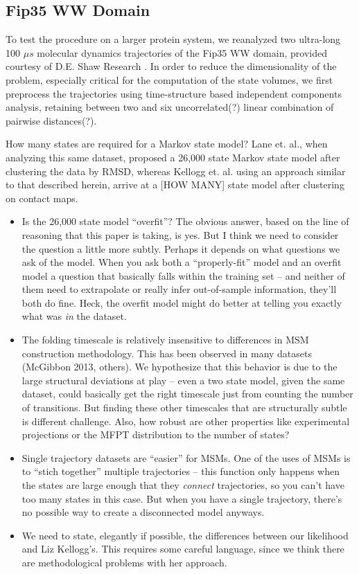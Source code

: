\documentclass[twocolumn,floatfix,nofootinbib,aps]{revtex4-1}
\begin{document}
\subsection{Fip35 WW Domain}

To test the procedure on a larger protein system, we reanalyzed two ultra-long 100 $\mu s$ molecular dynamics trajectories of the Fip35 WW domain\cite{Liu2008Experimental}, provided courtesy of D.E. Shaw Research \cite{}. In order to reduce the dimensionality of the problem, especially critical for the computation of the state volumes, we first preprocess the trajectories using time-structure based independent components analysis, retaining between two and six uncorrelated(?) linear combination of pairwise distances(?).

How many states are required for a Markov state model? Lane et. al., when analyzing this same dataset, proposed a 26,000 state Markov state model after clustering the data by RMSD, whereas Kellogg et. al. using an approach similar to that described herein, arrive at a [HOW MANY] state model after clustering on contact maps\cite{Lane2011Markov, Kellogg2012Evaluation}. 

\begin{itemize}
\item Is the 26,000 state model ``overfit''? The obvious answer, based on the line of reasoning that this paper is taking, is yes. But I think we need to consider the question a little more subtly. Perhaps it depends on what questions we ask of the model. When you ask both a ``properly-fit'' model and an overfit model a question that basically falls within the training set -- and neither of them need to extrapolate or really infer out-of-sample information, they'll both do fine. Heck, the overfit model might do better at telling you exactly what was \emph{in} the dataset.
\item The folding timescale is relatively insensitive to differences in MSM construction methodology. This has been observed in many datasets (McGibbon 2013, others). We hypothesize that this behavior is due to the large structural deviations at play -- even a two state model, given the same dataset, could basically get the right timescale just from counting the number of transitions. But finding these other timescales that are structurally subtle is different challenge. Also, how robust are other properties like experimental projections or the MFPT distribution to the number of states?
\item Single trajectory datasets are ``easier'' for MSMs. One of the uses of MSMs is to ``stich together'' multiple trajectories -- this function only happens when the states are large enough that they \emph{connect} trajectories, so you can't have too many states in this case. But when you have a single trajectory, there's no possible way to create a disconnected model anyways.
\item We need to state, elegantly if possible, the differences between our likelihood and Liz Kellogg's. This requires some careful language, since we think there are methodological problems with her approach.
\end{itemize}
\end{document}
